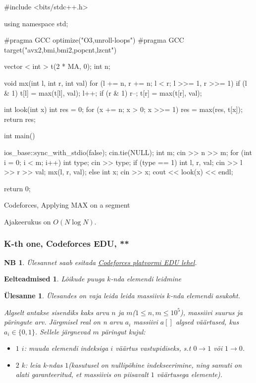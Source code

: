 \documentclass{trkut}
\newtheorem*{prereq}{Eelteadmised}
\newtheorem*{extra}{NB}
\newtheorem*{Text}{Ülesanne}
\begin{document}
\begin{cclol}
#include <bits/stdc++.h>

using namespace std;

#pragma GCC optimize("O3,unroll-loops")
#pragma GCC target("avx2,bmi,bmi2,popcnt,lzcnt")

vector < int > t(2 * MA, 0);
int n;

void mx(int l, int r, int val) {
  for (l += n, r += n; l < r; l >>= 1, r >>= 1) {
    if (l & 1) {
      t[l] = max(t[l], val);
      l++;
    }
    if (r & 1) {
      r--;
      t[r] = max(t[r], val);
    }
  }
}

int look(int x) {
  int res = 0;
  for (x += n; x > 0; x >>= 1) res = max(res, t[x]);
  return res;
}

int main() {
  ios_base::sync_with_stdio(false);
  cin.tie(NULL);
  int m;
  cin >> n >> m;
  for (int i = 0; i < m; i++) {
    int type;
    cin >> type;
    if (type == 1) {
      int l, r, val;
      cin >> l >> r >> val;
      mx(l, r, val);
    } else {
      int x;
      cin >> x;
      cout << look(x) << endl;
    }
  }

  return 0;
}
    \end{cclol}
    \begin{kk}[H]
    \caption{Codeforces, Applying MAX on a segment}%
    \end{kk}

Ajakeerukus on $O(N\log N)$.


\subsubsection{K-th one, Codeforces EDU, **}
\begin{extra}
Ülesannet saab esitada \href{https://codeforces.com/edu/course/2/lesson/4/2/practice/contest/273278/problem/B}{Codeforces platvormi EDU lehel}.
\end{extra}
\begin{prereq}
Lõikude puuga $k$-nda elemendi leidmine
\end{prereq}
\begin{Text}
Ülesandes on vaja leida leida massiivis $k$-nda elemendi asukoht.

Algselt antakse sisendiks kaks arvu $n$ ja $m$($1\le n, m\le 10^5$), massiivi suurus ja päringute arv.
Järgmisel real on n arvu $a_i$ massiivi $a[]$ algsed väärtused, kus $a_i\in\{0, 1\}$.
Sellele järgnevad $m$ päringut kujul:
\begin{itemize}
\item $1$ $i$: muuda elemendi indeksiga $i$ väärtus vastupidiseks, s.t $0\rightarrow 1$ või $1\rightarrow 0$. 
\item $2$ $k$: leia k-ndas $1$(kasutusel on nullipõhine indekseerimine, ning samuti on alati garanteeritud, et massiivis on piisavalt $1$ väärtusega elemente).
\end{itemize}

\parencite{14}
\end{Text}
\end{document}
